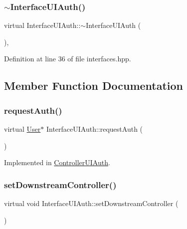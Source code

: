 \subsubsection{\texorpdfstring{$\sim$\+Interface\+U\+I\+Auth()}{~InterfaceUIAuth()}}
{\footnotesize\ttfamily virtual Interface\+U\+I\+Auth\+::$\sim$\+Interface\+U\+I\+Auth (\begin{DoxyParamCaption}\item[{void}]{ }\end{DoxyParamCaption})\hspace{0.3cm}{\ttfamily [inline]}, {\ttfamily [virtual]}}



Definition at line 36 of file interfaces.\+hpp.



\subsection{Member Function Documentation}
\mbox{\label{class_interface_u_i_auth_aa1c72a24f846accc6417a3b866ec9095}} 
\subsubsection{\texorpdfstring{request\+Auth()}{requestAuth()}}
{\footnotesize\ttfamily virtual \hyperlink{class_user}{User}$\ast$ Interface\+U\+I\+Auth\+::request\+Auth (\begin{DoxyParamCaption}\item[{void}]{ }\end{DoxyParamCaption})\hspace{0.3cm}{\ttfamily [pure virtual]}}



Implemented in \hyperlink{class_controller_u_i_auth_afb3e3fe781985fe7c7977b2c151dcd7a}{Controller\+U\+I\+Auth}.

\mbox{\label{class_interface_u_i_auth_af955fb60079d683f906912feb540c3ec}} 
\subsubsection{\texorpdfstring{set\+Downstream\+Controller()}{setDownstreamController()}}
{\footnotesize\ttfamily virtual void Interface\+U\+I\+Auth\+::set\+Downstream\+Controller (\begin{DoxyParamCaption}\item[{\hyperlink{class_interface_b_l_auth}{Interface\+B\+L\+Auth} $\ast$}]{ }\end{DoxyParamCaption})\hspace{0.3cm}{\ttfamily [pure virtual]}}



